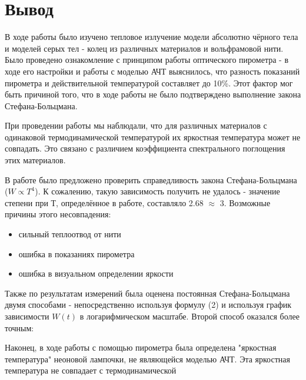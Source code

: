 \documentclass[15pt,a5paper,reqno]{article}
\begin{document}
\section{Вывод}
В ходе работы было изучено тепловое излучение модели абсолютно чёрного тела и моделей серых тел - колец из различных материалов и вольфрамовой нити. Было проведено ознакомление с принципом работы оптического пирометра - в ходе его настройки и работы с моделью АЧТ выяснилось, что разность показаний пирометра и действительной температурой составляет до 10\%. Этот фактор мог быть причиной того, что в ходе работы не было подтверждено выполнение закона Стефана-Больцмана. \par
При проведении работы мы наблюдали, что для различных материалов с одинаковой термодинамической температурой их яркостная температура может не совпадать. Это связано с различием коэффициента спектрального поглощения этих материалов. \par
В работе было предложено проверить справедливость закона Стефана-Больцмана ($W \propto T^4$). К сожалению, такую зависимость получить не удалось - значение степени при Т, определённое в работе, составляло 2.68 $\approx$ 3. Возможные причины этого несовпадения:
\begin{itemize}
    \item сильный теплоотвод от нити
    \item ошибка в показаниях пирометра
    \item ошибка в визуальном определении яркости
\end{itemize}
Также по результатам измерений была оценена постоянная Стефана-Больцмана двумя способами - непосредственно используя формулу (2) и используя график зависимости $W(t)$ в логарифмическом масштабе. Второй способ оказался более точным:


Наконец, в ходе работы с помощью пирометра была определена "яркостная температура" неоновой лампочки, не являющейся моделью АЧТ. Эта яркостная температура не совпадает с термодинамической
\end{document}
